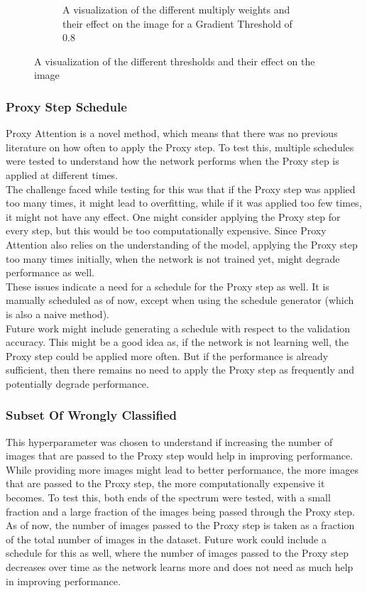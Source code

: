 \begin{figure}[!htb]
\begin{subfigure}[b]{0.5\textwidth}
        \caption{A visualization of the different multiply weights and their effect on the image for a Gradient Threshold of 0.8}
        \label{fig:mults}
    \end{subfigure}
    \caption{A visualization of the different thresholds and their effect on the image}
    \label{fig:thresholds_and_mults}
\end{figure}

\subsubsection{Proxy Step Schedule}
Proxy Attention is a novel method, which means that there was no previous literature on how often to apply the Proxy step. To test this, multiple schedules were tested to understand how the network performs when the Proxy step is applied at different times.\\
The challenge faced while testing for this was that if the Proxy step was applied too many times, it might lead to overfitting, while if it was applied too few times, it might not have any effect. One might consider applying the Proxy step for every step, but this would be too computationally expensive. Since Proxy Attention also relies on the understanding of the model, applying the Proxy step too many times initially, when the network is not trained yet, might degrade performance as well.\\
These issues indicate a need for a schedule for the Proxy step as well. It is manually scheduled as of now, except when using the schedule generator (which is also a naive method).\\
Future work might include generating a schedule with respect to the validation accuracy. This might be a good idea as, if the network is not learning well, the Proxy step could be applied more often. But if the performance is already sufficient, then there remains no need to apply the Proxy step as frequently and potentially degrade performance.


\subsubsection{Subset Of Wrongly Classified}
This hyperparameter was chosen to understand if increasing the number of images that are passed to the Proxy step would help in improving performance. While providing more images might lead to better performance, the more images that are passed to the Proxy step, the more computationally expensive it becomes. To test this, both ends of the spectrum were tested, with a small fraction and a large fraction of the images being passed through the Proxy step.\\
As of now, the number of images passed to the Proxy step is taken as a fraction of the total number of images in the dataset. Future work could include a schedule for this as well, where the number of images passed to the Proxy step decreases over time as the network learns more and does not need as much help in improving performance.

